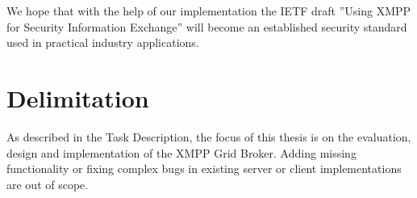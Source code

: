 We hope that with the help of our implementation the IETF draft ''Using XMPP for Security Information Exchange'' will become an established security standard used in practical industry applications.

\section{Delimitation} %
As described in the Task Description, the focus of this thesis is on the evaluation, design and implementation of the XMPP Grid Broker.
Adding missing functionality or fixing complex bugs in existing server or client implementations are out of scope.

